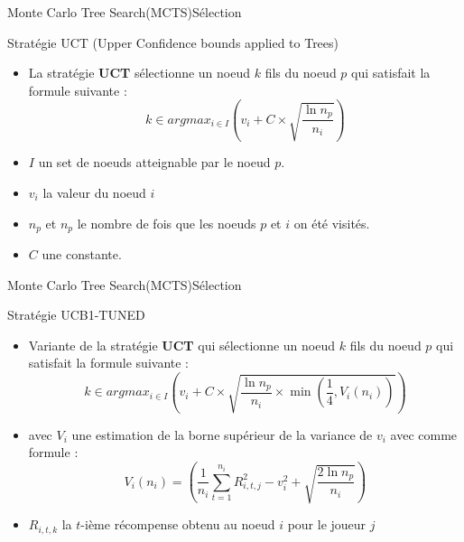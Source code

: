 \begin{frame}{Monte Carlo Tree Search(MCTS)}{Sélection}
	\begin{block}{Stratégie UCT (Upper Confidence bounds applied to Trees)}
		\begin{itemize}
			\item La stratégie \textbf{UCT} sélectionne un noeud $k$ fils du noeud $p$ qui satisfait la formule suivante :
			      $$k \in argmax_{i\in I}(v_{i} + C \times \sqrt{\frac{\ln n_{p}}{n_{i}}})$$
			\item $I$ un set de noeuds atteignable par le noeud $p$.
			\item $v_{i}$ la valeur du noeud $i$
			\item $n_{p}$ et $n_{p}$ le nombre de fois que les noeuds $p$ et $i$ on été visités.
			\item $C$ une constante.
		\end{itemize}
	\end{block}
\end{frame}

\begin{frame}{Monte Carlo Tree Search(MCTS)}{Sélection}
	\begin{block}{Stratégie UCB1-TUNED}
		\begin{itemize}
			\item Variante de la stratégie \textbf{UCT} qui sélectionne un noeud $k$ fils du noeud $p$ qui satisfait la formule suivante :
			      $$k \in argmax_{i\in I}(v_{i} + C \times \sqrt{\frac{\ln n_{p}}{n_{i}}\times \min(\frac{1}{4}, V_{i}(n_{i}))})$$
			\item avec $V_{i}$ une estimation de la borne supérieur de la variance de $v_{i}$ avec comme formule :
			      $$V_{i}(n_{i}) = (\frac{1}{n_{i}}\sum_{t=1}^{n_{i}}R_{i,t,j}^2 - v_{i}^2 + \sqrt{\frac{2\ln n_{p}}{n_{i}}})$$
			\item $R_{i,t,k}$ la $t$-ième récompense obtenu au noeud $i$ pour le joueur $j$
		\end{itemize}
	\end{block}
\end{frame}

